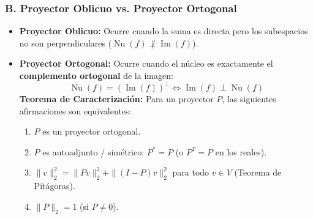 \documentclass[11pt,a4paper]{article}
\begin{document}
\subsubsection*{B. Proyector Oblicuo vs. Proyector Ortogonal}
\begin{itemize}
    \item \textbf{Proyector Oblicuo:} Ocurre cuando la suma es directa pero los subespacios no son perpendiculares ($\operatorname{Nu}(f) \not\perp \operatorname{Im}(f)$).
    \item \textbf{Proyector Ortogonal:} Ocurre cuando el núcleo es exactamente el \textbf{complemento ortogonal} de la imagen:
    \[
    \operatorname{Nu}(f) = (\operatorname{Im}(f))^\perp \iff \operatorname{Im}(f) \perp \operatorname{Nu}(f)
    \]
    \textbf{Teorema de Caracterización:} Para un proyector $P$, las siguientes afirmaciones son equivalentes:
    \begin{enumerate}
        \item $P$ es un proyector ortogonal.
        \item $P$ es autoadjunto / simétrico: $P^* = P$ (o $P^T = P$ en los reales).
        \item $\|v\|_2^2 = \|Pv\|_2^2 + \|(I - P)v\|_2^2$ para todo $v \in V$ (Teorema de Pitágoras).
        \item $\|P\|_2 = 1$ (si $P \neq 0$).
    \end{enumerate}
\end{itemize}

\begin{center}
\end{center}
\end{document}
